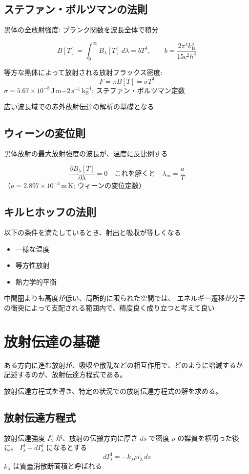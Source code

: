 \documentclass[article]{dennou777}
\newcommand{\Unit}[1]{\,\mathrm{#1}}
\begin{document}
\subsection{ステファン・ボルツマンの法則}
黒体の全放射強度: プランク関数を波長全体で積分

\[B[T]=\int^\infty_0 B_\lambda[T]\,d\lambda=bT^4, \qquad b=\frac{2\pi^4k_\mathrm{B}^4}{15c^2h^3}\]

等方な黒体によって放射される放射フラックス密度: \[F=\pi B[T]=\sigma T^4\]
$\sigma=5.67\times10^{-8}\Unit{J\,m{-2}\,s^{-1}\,k_\mathrm{B}^{-4}}$; ステファン・ボルツマン定数

広い波長域での赤外放射伝達の解析の基礎となる

\subsection{ウィーンの変位則}
黒体放射の最大放射強度の波長が、温度に反比例する

\[\frac{\partial B_\lambda[T]}{\partial\lambda}=0\quad\text{これを解くと}\quad\lambda_m=\frac{a}{T}\]
（$a=2.897\times10^{-3}\Unit{m\,K}$; ウィーンの変位定数）

\subsection{キルヒホッフの法則}
以下の条件を満たしているとき、射出と吸収が等しくなる

\begin{itemize}
	\item 一様な温度
	\item 等方性放射
	\item 熱力学的平衡
\end{itemize}

中間圏よりも高度が低い、局所的に限られた空間では、
エネルギー遷移が分子の衝突によって支配される範囲内で、精度良く成り立つと考えて良い

\section{放射伝達の基礎}
ある方向に進む放射が、吸収や散乱などの相互作用で、どのように増減するか
記述するのが、放射伝達方程式である。

放射伝達方程式を導き、特定の状況での放射伝達方程式の解を求める。

\subsection{放射伝達方程式}
放射伝達強度 $I_\lambda^\mathrm{d}$ が、放射の伝搬方向に厚さ $ds$ で密度 $\rho$ の媒質を横切った後に、
$I_\lambda^\mathrm{d}+dI_\lambda^\mathrm{d}$ になるとする
\[dI_\lambda^\mathrm{d}=-k_\lambda\rho i_\lambda\,ds\]
$k_\lambda$ は質量消散断面積と呼ばれる
\end{document}
